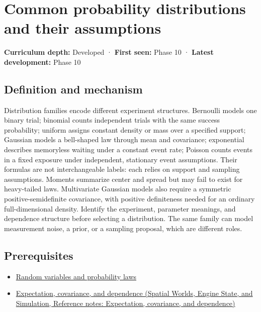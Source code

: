 \hypertarget{appendix-a2360b435383}{}\label{referencestart:appendix-a2360b435383}
\section{Common probability distributions and their assumptions}\label{appendix-a2360b435383-common-probability-distributions-and-their-assumptions}

\textbf{Curriculum depth:} Developed · \textbf{First seen:} Phase 10 · \textbf{Latest development:} Phase 10

\begin{allmightroledefinition}

\subsection{Definition and mechanism}\label{appendix-a2360b435383-definition-and-mechanism}

Distribution families encode different experiment structures. Bernoulli models one binary trial; binomial counts independent trials with the same success probability; uniform assigns constant density or mass over a specified support; Gaussian models a bell-shaped law through mean and covariance; exponential describes memoryless waiting under a constant event rate; Poisson counts events in a fixed exposure under independent, stationary event assumptions. Their formulas are not interchangeable labels: each relies on support and sampling assumptions. Moments summarize center and spread but may fail to exist for heavy-tailed laws. Multivariate Gaussian models also require a symmetric positive-semidefinite covariance, with positive definiteness needed for an ordinary full-dimensional density. Identify the experiment, parameter meanings, and dependence structure before selecting a distribution. The same family can model measurement noise, a prior, or a sampling proposal, which are different roles.

\end{allmightroledefinition}

\subsection{Prerequisites}\label{appendix-a2360b435383-prerequisites}

\begin{itemize}
\tightlist
\item
  \hyperref[appendix-4d0203f7944f]{Random variables and probability laws}
\item
  \href{../05-Spatial-Worlds-Engine-State-and-Simulation/main.pdf\#nameddest=appendix-54c383df9992}{Expectation, covariance, and dependence (Spatial Worlds, Engine State, and Simulation, Reference notes: Expectation, covariance, and dependence)}
\end{itemize}

